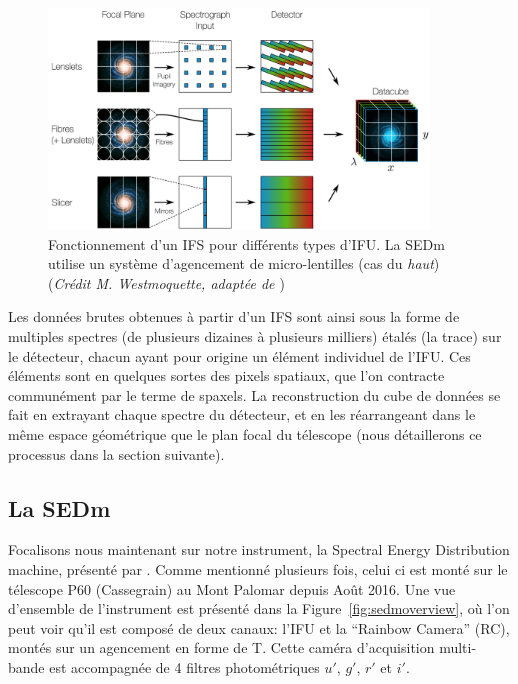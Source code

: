 \documentclass[../main/main.tex]{subfiles}
\begin{document}
\begin{figure}[h]
  \centering
  \includegraphics[width=0.9\textwidth]{../figures/03_sedm/ifsgeneral.png}
  \caption[Fonctionnement d'un IFS]{Fonctionnement d'un IFS pour
    différents types d'IFU. La SEDm utilise un système d'agencement de micro-lentilles (cas
    du \textit{haut})
    (\textit{Crédit M. Westmoquette, adaptée de \citet{allingtonIFS}})}
  \label{fig:ifsgeneral}
\end{figure}

Les données brutes obtenues à partir d'un IFS sont ainsi sous la forme
de multiples spectres (de plusieurs dizaines à plusieurs milliers)
étalés (la trace) sur le détecteur, chacun ayant pour origine un élément individuel
de l'IFU. Ces éléments sont en quelques sortes des pixels spatiaux, que
l'on contracte communément par le terme de spaxels. La reconstruction du
cube de données se fait en extrayant chaque spectre du détecteur, et en
les réarrangeant dans le même espace géométrique que le plan focal du
télescope (nous détaillerons ce processus dans la section suivante).

\subsection{La SEDm}

Focalisons nous maintenant sur notre instrument, la Spectral Energy
Distribution machine, présenté par \citet{SEDM18}. Comme mentionné plusieurs fois, celui ci est monté
sur le télescope P60 (Cassegrain) au Mont Palomar depuis Août 2016. Une vue
d'ensemble de l'instrument est présenté dans la
Figure~\ref{fig:sedmoverview}, où l'on peut voir qu'il est composé de
deux canaux: l'IFU et la ``Rainbow Camera'' (RC), montés sur un
agencement en forme de T. Cette caméra d'acquisition multi-bande est
accompagnée de 4 filtres photométriques $u'$, $g'$, $r'$ et $i'$.
\end{document}
